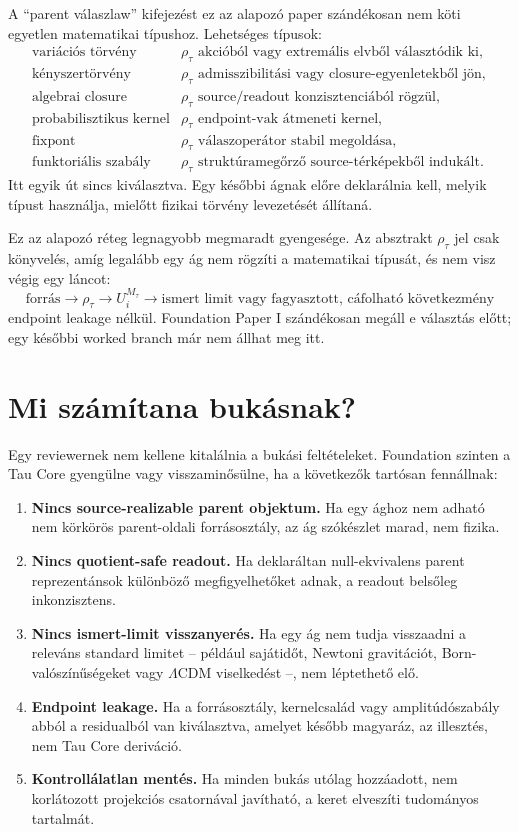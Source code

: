 \documentclass[12pt]{article}
\newcommand{\Rmap}{\rho_{\tau}}
\newcommand{\Mta}{M_{\tau}}
\begin{document}
A ``parent válaszlaw'' kifejezést ez az alapozó paper szándékosan nem köti
egyetlen matematikai típushoz.  Lehetséges típusok:
\[
\begin{array}{ll}
\text{variációs törvény} & \Rmap \text{ akcióból vagy extremális elvből választódik ki},\\
\text{kényszertörvény} & \Rmap \text{ admisszibilitási vagy closure-egyenletekből jön},\\
\text{algebrai closure} & \Rmap \text{ source/readout konzisztenciából rögzül},\\
\text{probabilisztikus kernel} & \Rmap \text{ endpoint-vak átmeneti kernel},\\
\text{fixpont} & \Rmap \text{ válaszoperátor stabil megoldása},\\
\text{funktoriális szabály} & \Rmap \text{ struktúramegőrző source-térképekből indukált}.
\end{array}
\]
Itt egyik út sincs kiválasztva.  Egy későbbi ágnak előre deklarálnia kell,
melyik típust használja, mielőtt fizikai törvény levezetését állítaná.

Ez az alapozó réteg legnagyobb megmaradt gyengesége.  Az absztrakt
\(\Rmap\) jel csak könyvelés, amíg legalább egy ág nem rögzíti a matematikai
típusát, és nem visz végig egy láncot:
\[
  \text{forrás}\to\Rmap\to U_i^{\Mta}
  \to \text{ismert limit vagy fagyasztott, cáfolható következmény}
\]
endpoint leakage nélkül.  Foundation Paper I szándékosan megáll e választás
előtt; egy későbbi worked branch már nem állhat meg itt.

\section{Mi számítana bukásnak?}

Egy reviewernek nem kellene kitalálnia a bukási feltételeket.  Foundation
szinten a Tau Core gyengülne vagy visszaminősülne, ha a következők tartósan
fennállnak:
\begin{enumerate}[label=(F\arabic*)]
  \item \textbf{Nincs source-realizable parent objektum.}  Ha egy ághoz nem
  adható nem körkörös parent-oldali forrásosztály, az ág szókészlet marad,
  nem fizika.
  \item \textbf{Nincs quotient-safe readout.}  Ha deklaráltan null-ekvivalens
  parent reprezentánsok különböző megfigyelhetőket adnak, a readout belsőleg
  inkonzisztens.
  \item \textbf{Nincs ismert-limit visszanyerés.}  Ha egy ág nem tudja
  visszaadni a releváns standard limitet -- például sajátidőt, Newtoni
  gravitációt, Born-valószínűségeket vagy \(\Lambda\)CDM viselkedést --, nem
  léptethető elő.
  \item \textbf{Endpoint leakage.}  Ha a forrásosztály, kernelcsalád vagy
  amplitúdószabály abból a residualból van kiválasztva, amelyet később magyaráz,
  az illesztés, nem Tau Core deriváció.
  \item \textbf{Kontrollálatlan mentés.}  Ha minden bukás utólag hozzáadott,
  nem korlátozott projekciós csatornával javítható, a keret elveszíti
  tudományos tartalmát.
\end{enumerate}
\end{document}
